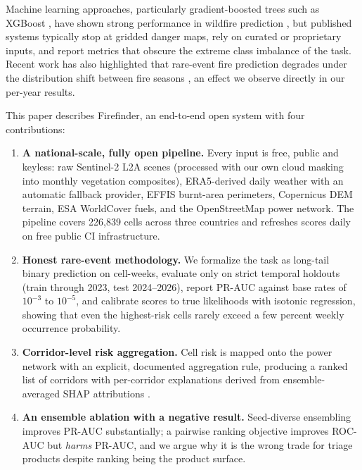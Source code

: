 \documentclass[11pt]{article}
\begin{document}
Machine learning approaches, particularly gradient-boosted trees such as
XGBoost \citep{chen2016xgboost}, have shown strong performance in wildfire
prediction \citep{wang2021identifying,kondylatos2022wildfire,buch2023smlfire},
but published systems typically stop at gridded danger maps, rely on curated
or proprietary inputs, and report metrics that obscure the extreme class
imbalance of the task. Recent work has also highlighted that rare-event fire
prediction degrades under the distribution shift between fire seasons
\citep{jiang2026eapo}, an effect we observe directly in our per-year results.

This paper describes Firefinder, an end-to-end open system with four
contributions:

\begin{enumerate}
  \item \textbf{A national-scale, fully open pipeline.} Every input is free,
  public and keyless: raw Sentinel-2 L2A scenes (processed with our own
  cloud masking into monthly vegetation composites), ERA5-derived daily
  weather with an automatic fallback provider, EFFIS burnt-area perimeters,
  Copernicus DEM terrain, ESA WorldCover fuels, and the OpenStreetMap power
  network. The pipeline covers 226{,}839 cells across three countries and
  refreshes scores daily on free public CI infrastructure.
  \item \textbf{Honest rare-event methodology.} We formalize the task as
  long-tail binary prediction on cell-weeks, evaluate only on strict temporal
  holdouts (train through 2023, test 2024--2026), report PR-AUC against base
  rates of $10^{-3}$ to $10^{-5}$, and calibrate scores to true likelihoods
  with isotonic regression, showing that even the highest-risk cells rarely
  exceed a few percent weekly occurrence probability.
  \item \textbf{Corridor-level risk aggregation.} Cell risk is mapped onto
  the power network with an explicit, documented aggregation rule, producing
  a ranked list of corridors with per-corridor explanations derived from
  ensemble-averaged SHAP attributions \citep{lundberg2017shap}.
  \item \textbf{An ensemble ablation with a negative result.} Seed-diverse
  ensembling improves PR-AUC substantially; a pairwise ranking objective
  improves ROC-AUC but \emph{harms} PR-AUC, and we argue why it is the wrong
  trade for triage products despite ranking being the product surface.
\end{enumerate}
\end{document}
